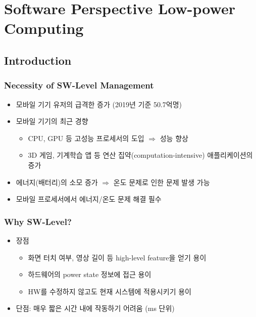 \section{Software Perspective Low-power Computing}

\subsection{Introduction}

\subsubsection*{Necessity of SW-Level Management}
\begin{itemize}
    \item 모바일 기기 유저의 급격한 증가 (2019년 기준 50.7억명)
    \item 모바일 기기의 최근 경향
    \begin{itemize}
        \item CPU, GPU 등 고성능 프로세서의 도입 $\Rightarrow$ 성능 향상
        \item 3D 게임, 기계학습 앱 등 연산 집약(computation-intensive) 애플리케이션의 증가
    \end{itemize}
    \item 에너지(배터리)의 소모 증가 $\Rightarrow$ 온도 문제로 인한 문제 발생 가능
    \item 모바일 프로세서에서 에너지/온도 문제 해결 필수
\end{itemize}

\subsubsection*{Why SW-Level?}
\begin{itemize}
    \item 장점
    \begin{itemize}
        \item 화면 터치 여부, 영상 길이 등 high-level feature을 얻기 용이
        \item 하드웨어의 power state 정보에 접근 용이
        \item HW를 수정하지 않고도 현재 시스템에 적용시키기 용이
    \end{itemize}
    \item 단점: 매우 짧은 시간 내에 작동하기 어려움 (ms 단위)
\end{itemize}
